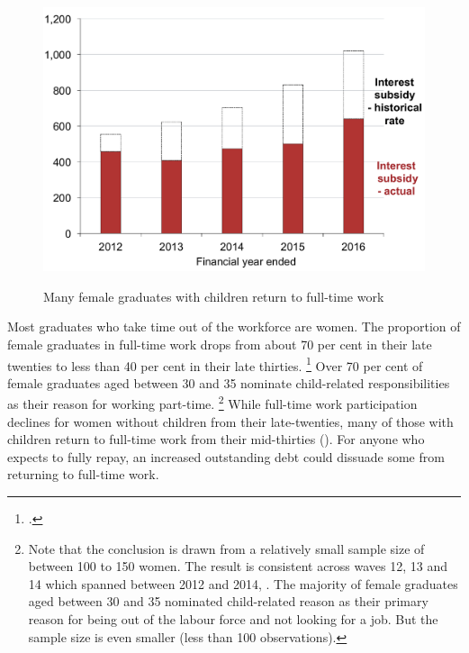 \documentclass[embargoed]{grattan}
\begin{document}
\begin{figure}
\caption{Many female graduates with children return to full-time work}\label{fig:fig16-many-female-grads-with-children-return-to-full-time-work}


\includegraphics[page=16]{atlas/Chartpack.pdf}
{\textcite{ABS2012Censuspopulationhousing}}
\end{figure}

Most graduates who take time out of the workforce are women.
The proportion of female graduates in full-time work drops from about 70 per cent in their late twenties to less than 40 per cent in their late thirties.%
\footcite[][Figure~9]{Norton2016HELPfuturefairer} %
Over 70 per cent of female graduates aged between 30 and 35 nominate child-related responsibilities as their reason for working part-time.%
\footnote{Note that the conclusion is drawn from a relatively small sample size of between 100 to 150 women.
The result is consistent across waves 12, 13 and 14 which spanned between 2012 and 2014, \textcite{HILDA2015HouseholdIncomeLabour}.
The majority of female graduates aged between 30 and 35 nominated child-related reason as their primary reason for being out of the labour force and not looking for a job.
But the sample size is even smaller (less than 100 observations).} 
While full-time work participation declines for women without children from their late-twenties, many of those with children return to full-time work from their mid-thirties ().
For anyone who expects to fully repay, an increased outstanding debt could dissuade some from returning to full-time work.
\end{document}

